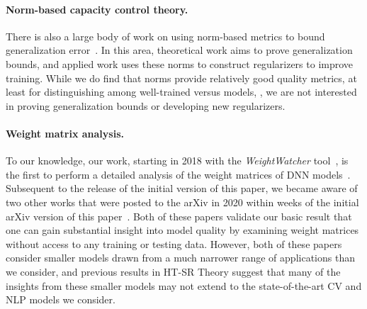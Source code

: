 \paragraph{Norm-based capacity control theory.}

There is also a large body of work on using norm-based metrics to bound generalization error~\cite{NTS15, BFT17_TR, LMBx18_TR}.
In this area, theoretical work aims to prove generalization bounds, and applied work uses these norms to construct regularizers to improve training.
While we do find that norms provide relatively good quality metrics, at least for distinguishing among  well-trained versus 
 models, , 
we are not interested in proving generalization bounds or developing new regularizers.

\paragraph{Weight matrix analysis.}
To our knowledge, our work, starting in 2018 with the \emph{WeightWatcher} tool~\cite{weightwatcher_package}, is the first to perform a detailed analysis of the weight matrices of DNN models~\cite{MM18_TR, MM19_HTSR_ICML, MM20_SDM}.
Subsequent to the release of the initial version of this paper, we became aware of two other works that were posted to the arXiv in 2020 within weeks of the initial arXiv version of this paper~\cite{EJRUY20_TR,UKGBT20_TR}.
Both of these papers validate our basic result that one can gain substantial insight into model quality by examining weight matrices without access to any training or testing data.
However, both of these papers consider smaller models drawn from a much narrower range of applications than we consider, and previous results in HT-SR Theory suggest that many of the insights from these smaller models may not extend to the state-of-the-art CV and NLP models we consider.



